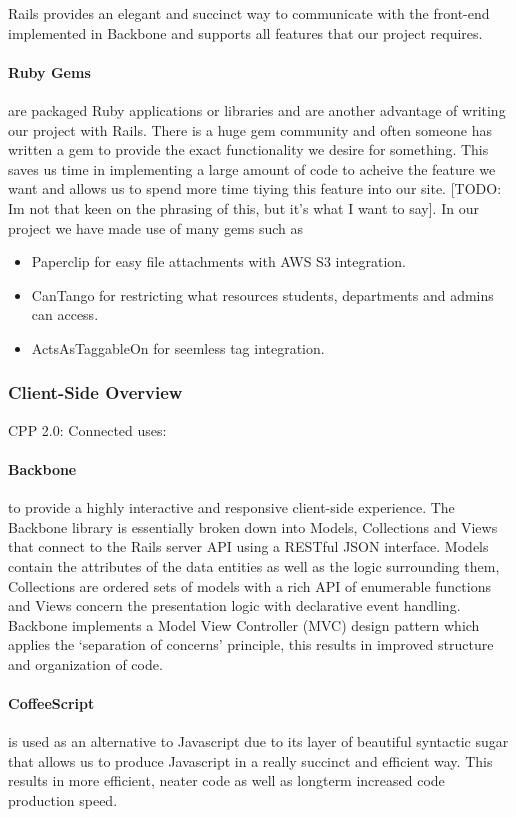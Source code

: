 		Rails provides an elegant and succinct way to communicate with the front-end implemented in Backbone and supports all features that our project requires. 

		\paragraph{Ruby Gems\cite{gems}} are packaged Ruby applications or libraries and are another advantage of writing our project with Rails. There is a huge gem community and often someone has written a gem to provide the exact functionality we desire for something. This saves us time in implementing a large amount of code to acheive the feature we want and allows us to spend more time tiying this feature into our site. [TODO: Im not that keen on the phrasing of this, but it's what I want to say]. In our project we have made use of many gems such as
		\begin{itemize}
		 \item Paperclip\cite{paperclip} for easy file attachments with AWS S3\cite{s3} integration.
		 \item CanTango\cite{cantango} for restricting what resources students, departments and admins can access.
		 \item ActsAsTaggableOn\cite{tags} for seemless tag integration.
		\end{itemize}
	\subsubsection{Client-Side Overview}
		CPP 2.0: Connected uses:
		\paragraph{Backbone\cite{backbone}} to provide a highly interactive and responsive client-side experience. The Backbone library is essentially broken down into Models, Collections and Views that connect to the Rails server API using a RESTful JSON interface. Models contain the attributes of the data entities as well as the logic surrounding them, Collections are ordered sets of models with a rich API of enumerable functions and Views concern the presentation logic with declarative event handling. Backbone implements a Model View Controller (MVC) design pattern which applies the ‘separation of  concerns’ principle, this results in improved structure and organization of code.
		\paragraph{CoffeeScript\cite{coffeescript}} is used as an alternative to Javascript due to its layer of beautiful syntactic sugar that allows us to produce Javascript in a really succinct and efficient way. This results in more efficient, neater code as well as longterm increased code production speed.
